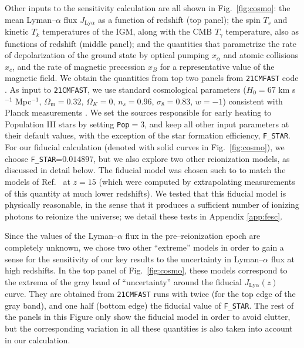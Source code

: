Other inputs to the sensitivity calculation are all shown in Fig.~\ref{fig:cosmo}: the mean Lyman--$\alpha$ flux $J_{\text{Ly}\alpha}$ as a function of redshift (top panel); the spin $T_s$ and kinetic $T_k$ temperatures of the IGM, along with the CMB $T_\gamma$ temperature, also as functions of redshift (middle panel); and the quantities that parametrize the rate of depolarization of the ground state by optical pumping $x_\alpha$ and atomic collisions $x_c$, and the rate of magnetic precession $x_B$ for a representative value of the magnetic field. We obtain the quantities from top two panels from \texttt{21CMFAST} code \cite{2011MNRAS.411..955M}. As input to \texttt{21CMFAST}, we use standard cosmological parameters ($H_0=67$ km s$^{-1}$ Mpc$^{-1}$, $\Omega_\text{m}=0.32$, $\Omega_K=0$, $n_s=0.96$, $\sigma_8=0.83$, $w=-1$) consistent with Planck measurements \cite{2015arXiv150201589P}. We set the sources responsible for early heating to Population III stars by setting \verb|Pop|$=3$, and keep all other input parameters at their default values, with the exception of the star formation efficiency, \verb|F_STAR|. For our fiducial calculation (denoted with solid curves in Fig.~\ref{fig:cosmo}), we choose \verb|F_STAR|=$0.014897$, but we also explore two other reionization models, as discussed in detail below. The fiducial model  was chosen such to to match the models of Ref.~\cite{2012ApJ...746..125H} at $z=15$ (which were computed by extrapolating measurements of this quantity at much lower redshifts). We tested that this fiducial model is physically reasonable, in the sense that it produces a sufficient number of ionizing photons to reionize the universe; we detail these tests in Appendix \ref{app:fesc}. 

Since the values of the Lyman--$\alpha$ flux in the pre--reionization epoch are completely unknown, we chose two other ``extreme'' models in order to gain a sense for the sensitivity of our key results to the uncertainty in Lyman--$\alpha$ flux at high redshifts. In the top panel of Fig.~\ref{fig:cosmo}, these models correspond to the extrema of the gray band of ``uncertainty'' around the fiducial $J_{\text{Ly}\alpha}(z)$ curve. They are obtained from \texttt{21CMFAST} runs with twice (for the top edge of the gray band), and one half (bottom edge) the fiducial value of \verb|F_STAR|.  The rest of the panels in this Figure only show the fiducial model in order to avoid clutter, but the corresponding variation in all these quantities is also taken into account in our calculation. 

